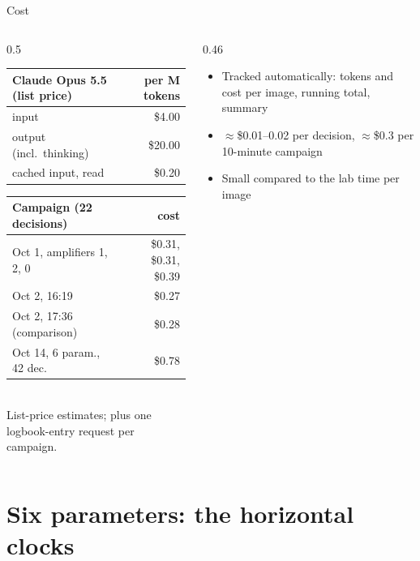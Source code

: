 \documentclass[aspectratio=169,10pt]{beamer}
\begin{document}
\begin{frame}{Cost}
  \begin{columns}[T]
    \begin{column}{0.5\textwidth}
      \small
      \begin{tabular}{lr}
        \toprule
        Claude Opus 5.5 (list price) & per M tokens \\
        \midrule
        input & \$4.00 \\
        output (incl.\ thinking) & \$20.00 \\
        cached input, read & \$0.20 \\
        \bottomrule
      \end{tabular}

      \vspace{3mm}
      \begin{tabular}{lr}
        \toprule
        Campaign (22 decisions) & cost \\
        \midrule
        Oct 1, amplifiers 1, 2, 0 & \$0.31, \$0.31, \$0.39 \\
        Oct 2, 16:19 & \$0.27 \\
        Oct 2, 17:36 (comparison) & \$0.28 \\
        Oct 14, 6 param., 42 dec. & \$0.78 \\
        \bottomrule
      \end{tabular}
      {\scriptsize\\ List-price estimates; plus one logbook-entry request per campaign.}
    \end{column}
    \begin{column}{0.46\textwidth}
      \begin{itemize}\small
        \item Tracked automatically: tokens and cost per image, running total, summary
        \item $\approx$\$0.01--0.02 per decision, $\approx$\$0.3 per 10-minute campaign
        \item Small compared to the lab time per image
      \end{itemize}
    \end{column}
  \end{columns}
\end{frame}

\section{Six parameters: the horizontal clocks}
\end{document}
